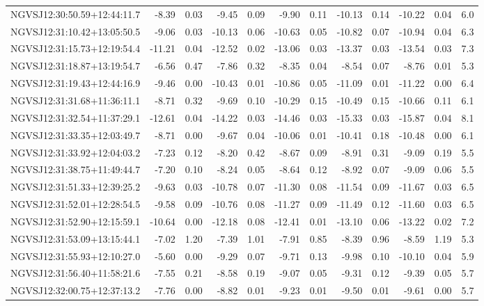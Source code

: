 \begin{tabular}{lrrrrrrrrrrc}
NGVSJ12:30:50.59+12:44:11.7 & -8.39 & 0.03 & -9.45 & 0.09 & -9.90 & 0.11 & -10.13 & 0.14 & -10.22 & 0.04 & 6.0 \\
NGVSJ12:31:10.42+13:05:50.5 & -9.06 & 0.03 & -10.13 & 0.06 & -10.63 & 0.05 & -10.82 & 0.07 & -10.94 & 0.04 & 6.3 \\
NGVSJ12:31:15.73+12:19:54.4 & -11.21 & 0.04 & -12.52 & 0.02 & -13.06 & 0.03 & -13.37 & 0.03 & -13.54 & 0.03 & 7.3 \\
NGVSJ12:31:18.87+13:19:54.7 & -6.56 & 0.47 & -7.86 & 0.32 & -8.35 & 0.04 & -8.54 & 0.07 & -8.76 & 0.01 & 5.3 \\
NGVSJ12:31:19.43+12:44:16.9 & -9.46 & 0.00 & -10.43 & 0.01 & -10.86 & 0.05 & -11.09 & 0.01 & -11.22 & 0.00 & 6.4 \\
NGVSJ12:31:31.68+11:36:11.1 & -8.71 & 0.32 & -9.69 & 0.10 & -10.29 & 0.15 & -10.49 & 0.15 & -10.66 & 0.11 & 6.1 \\
NGVSJ12:31:32.54+11:37:29.1 & -12.61 & 0.04 & -14.22 & 0.03 & -14.46 & 0.03 & -15.33 & 0.03 & -15.87 & 0.04 & 8.1 \\
NGVSJ12:31:33.35+12:03:49.7 & -8.71 & 0.00 & -9.67 & 0.04 & -10.06 & 0.01 & -10.41 & 0.18 & -10.48 & 0.00 & 6.1 \\
NGVSJ12:31:33.92+12:04:03.2 & -7.23 & 0.12 & -8.20 & 0.42 & -8.67 & 0.09 & -8.91 & 0.31 & -9.09 & 0.19 & 5.5 \\
NGVSJ12:31:38.75+11:49:44.7 & -7.20 & 0.10 & -8.24 & 0.05 & -8.64 & 0.12 & -8.92 & 0.07 & -9.09 & 0.06 & 5.5 \\
NGVSJ12:31:51.33+12:39:25.2 & -9.63 & 0.03 & -10.78 & 0.07 & -11.30 & 0.08 & -11.54 & 0.09 & -11.67 & 0.03 & 6.5 \\
NGVSJ12:31:52.01+12:28:54.5 & -9.58 & 0.09 & -10.76 & 0.08 & -11.27 & 0.09 & -11.49 & 0.12 & -11.60 & 0.03 & 6.5 \\
NGVSJ12:31:52.90+12:15:59.1 & -10.64 & 0.00 & -12.18 & 0.08 & -12.41 & 0.01 & -13.10 & 0.06 & -13.22 & 0.02 & 7.2 \\
NGVSJ12:31:53.09+13:15:44.1 & -7.02 & 1.20 & -7.39 & 1.01 & -7.91 & 0.85 & -8.39 & 0.96 & -8.59 & 1.19 & 5.3 \\
NGVSJ12:31:55.93+12:10:27.0 & -5.60 & 0.00 & -9.29 & 0.07 & -9.71 & 0.13 & -9.98 & 0.10 & -10.10 & 0.04 & 5.9 \\
NGVSJ12:31:56.40+11:58:21.6 & -7.55 & 0.21 & -8.58 & 0.19 & -9.07 & 0.05 & -9.31 & 0.12 & -9.39 & 0.05 & 5.7 \\
NGVSJ12:32:00.75+12:37:13.2 & -7.76 & 0.00 & -8.82 & 0.01 & -9.23 & 0.01 & -9.50 & 0.01 & -9.61 & 0.00 & 5.7 \\

\end{tabular}
